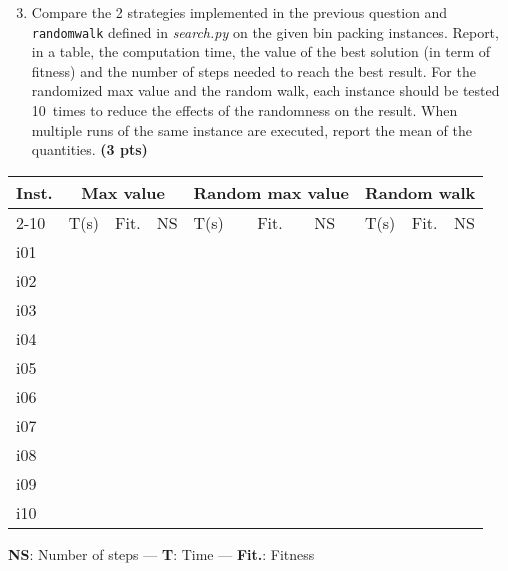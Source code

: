 \documentclass[11pt,a4paper]{report}
\begin{document}
\begin{answers}[2.5 cm]
\end{answers}



\begin{enumerate}
\setcounter{enumi}{2}
\item Compare the 2 strategies implemented in the previous question and \texttt{randomwalk} defined in \textit{search.py} on the given bin packing instances. Report, in a table, the computation time, the value of the best solution (in term of fitness) and the number of steps needed to reach the best result. For the randomized max value and the random walk, each instance should be tested 10~times to reduce the effects of the randomness on the result. When multiple runs of the same instance are executed, report the mean of the quantities. \textbf{(3 pts)}
\end{enumerate}

\begin{answers}[7cm]
\begin{center}
\begin{tabular}{||l||l|l|l||l|l|l||l|l|l||}
\hline
\multirow{3}{*}{Inst.} & \multicolumn{3}{c||}{Max value} & \multicolumn{3}{c||}{Random max value} & \multicolumn{3}{c||}{Random walk} \\
\cline{2-10}
\cline{2-10}
 & T(s) & Fit. & NS & T(s) & Fit. & NS & T(s) & Fit. & NS\\
\hline
i01 & & & & & & & & &\\
\hline
i02 & & & & & & & & &\\
\hline
i03 & & & & & & & & &\\
\hline
i04 & & & & & & & & &\\
\hline
i05 & & & & & & & & &\\
\hline
i06 & & & & & & & & &\\
\hline
i07 & & & & & & & & &\\
\hline
i08 & & & & & & & & &\\
\hline
i09 & & & & & & & & &\\
\hline
i10 & & & & & & & & &\\
\hline
\end{tabular}
\end{center}
\textbf{NS}: Number of steps — \textbf{T}: Time — \textbf{Fit.}: Fitness
\end{answers}
\end{document}
